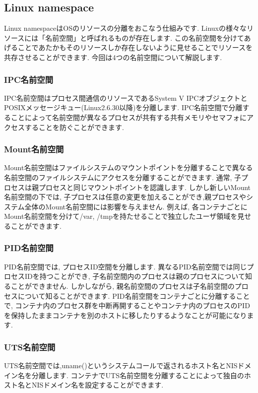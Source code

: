 \subsection{Linux namespace}
Linux namespaceはOSのリソースの分離をおこなう仕組みです. Linuxの様々なリソースには「名前空間」と呼ばれるものが存在します. この名前空間を分けてあげることであたかもそのリソースしか存在しないように見せることでリソースを共存させることができます. 今回は4つの名前空間について解説します.
\subsubsection{IPC名前空間}
IPC名前空間はプロセス間通信のリソースであるSystem V IPCオブジェクトとPOSIXメッセージキュー(Linux2.6.30以降)を分離します. IPC名前空間で分離することによって名前空間が異なるプロセスが共有する共有メモリやセマフォにアクセスすることを防ぐことができます.
\subsubsection{Mount名前空間}
Mount名前空間はファイルシステムのマウントポイントを分離することで異なる名前空間のファイルシステムにアクセスを分離することができます. 通常, 子プロセスは親プロセスと同じマウントポイントを認識します. しかし新しいMount名前空間の下では, 子プロセスは任意の変更を加えることができ,親プロセスやシステム全体のMount名前空間には影響を与えません. 例えば, 各コンテナごとにMount名前空間を分けて/var, /tmpを持たせることで独立したユーザ領域を見せることができます.
\subsubsection{PID名前空間}
PID名前空間では, プロセスID空間を分離します. 異なるPID名前空間では同じプロセスIDを持つことができ, 子名前空間内のプロセスは親のプロセスについて知ることができません. しかしながら, 親名前空間のプロセスは子名前空間のプロセスについて知ることができます. PID名前空間をコンテナごとに分離することで, コンテナ内のプロセス群を中断再開することやコンテナ内のプロセスのPIDを保持したままコンテナを別のホストに移したりするようなことが可能になります.
\subsubsection{UTS名前空間}
UTS名前空間では,uname()というシステムコールで返されるホスト名とNISドメイン名を分離します. コンテナでUTS名前空間を分離することによって独自のホスト名とNISドメイン名を設定することができます.
